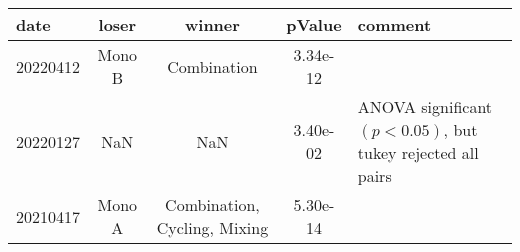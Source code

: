 \begin{tabular}{lcccp{5cm}}
\toprule
date & loser & winner & pValue & comment \\
\midrule
20220412 & Mono B & Combination & 3.34e-12 &  \\
20220127 & NaN & NaN & 3.40e-02 & ANOVA significant $(p<0.05)$, but tukey rejected all pairs \\
20210417 & Mono A & Combination, Cycling, Mixing & 5.30e-14 &  \\
\bottomrule
\end{tabular}
